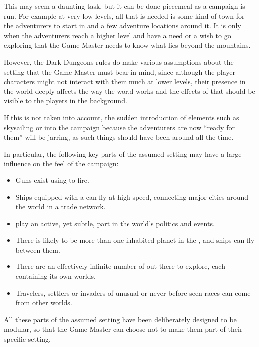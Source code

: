 \begin{multicols*}{2}
This may seem a daunting task, but it can be done piecemeal as a campaign is run. For example at very low levels, all that is needed is some kind of town for the adventurers to start in and a few adventure locations around it. It is only when the adventurers reach a higher level and have a need or a wish to go exploring that the Game Master needs to know what lies beyond the mountains.

However, the Dark Dungeons rules do make various assumptions about the setting that the Game Master must bear in mind, since although the player characters might not interact with them much at lower levels, their presence in the world deeply affects the way the world works and the effects of that should be visible to the players in the background.

If this is not taken into account, the sudden introduction of elements such as skysailing or  into the campaign because the adventurers are now “ready for them” will be jarring, as such things should have been around all the time.

In particular, the following key parts of the assumed setting may have a large influence on the feel of the campaign:

\begin{itemize}
	\item{Guns exist using  to fire.}
	\item{Ships equipped with a  can fly at high speed, connecting major cities around the world in a trade network.}
	\item{ play an active, yet subtle, part in the world’s politics and events.}
	\item{There is likely to be more than one inhabited planet in the , and ships can fly between them.}
	\item{There are an effectively infinite number of  out there to explore, each containing its own worlds.}
	\item{Travelers, settlers or invaders of unusual or never-before-seen races can come from other worlds.}
\end{itemize}

All these parts of the assumed setting have been deliberately designed to be modular, so that the Game Master can choose not to make them part of their specific setting.


\end{multicols*}
